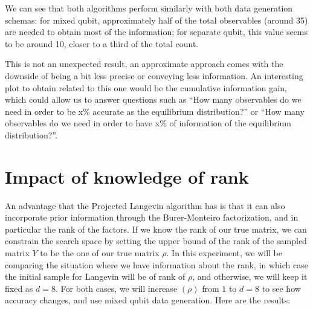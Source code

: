 \documentclass[12pt]{memoir}
\newcommand{\rhorank}[0]{\text{rank}$(\rho) $ }
\begin{document}
We can see that both algorithms perform similarly with both data generation schemas: for mixed qubit, approximately half of the total observables (around 35) are needed to obtain most of the information; for separate qubit, this value seems to be around 10, closer to a third of the total count.\medbreak


This is not an unexpected result, an approximate approach comes with the downside of being a bit less precise or conveying less information. An interesting plot to obtain related to this one would be the cumulative information gain, which could allow us to answer questions such as ``How many observables do we need in order to be x\% accurate as the equilibrium distribution?'' or ``How many observables do we need in order to have x\% of information of the equilibrium distribution?''.


\section{Impact of knowledge of rank}\label{section:comp-rank-info}

An advantage that the Projected Langevin algorithm has is that it can also incorporate prior information through the Burer-Monteiro factorization, and in particular the rank of the factors. If we know the rank of our true matrix, we can constrain the search space by setting the upper bound of the rank of the sampled matrix $Y$ to be the one of our true matrix $\rho$. In this experiment, we will be comparing the situation where we have information about the rank, in which case the initial sample for Langevin will be of rank of $\rho$, and otherwise, we will keep it fixed as $d=8$. For both cases, we will increase \rhorank from $1$ to $d=8$ to see how accuracy changes, and use mixed qubit data generation. Here are the results:
\end{document}
